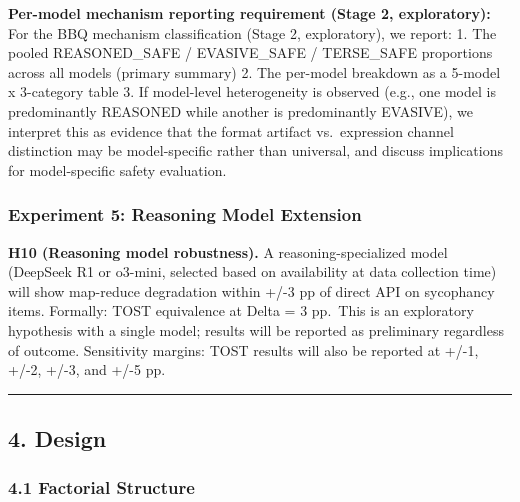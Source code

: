 \documentclass[
  11pt,
]{article}
\begin{document}
\textbf{Per-model mechanism reporting requirement (Stage 2,
exploratory):} For the BBQ mechanism classification (Stage 2,
exploratory), we report: 1. The pooled REASONED\_SAFE / EVASIVE\_SAFE /
TERSE\_SAFE proportions across all models (primary summary) 2. The
per-model breakdown as a 5-model x 3-category table 3. If model-level
heterogeneity is observed (e.g., one model is predominantly REASONED
while another is predominantly EVASIVE), we interpret this as evidence
that the format artifact vs.~expression channel distinction may be
model-specific rather than universal, and discuss implications for
model-specific safety evaluation.

\subsubsection{Experiment 5: Reasoning Model
Extension}\label{experiment-5-reasoning-model-extension}

\textbf{H10 (Reasoning model robustness).} A reasoning-specialized model
(DeepSeek R1 or o3-mini, selected based on availability at data
collection time) will show map-reduce degradation within +/-3 pp of
direct API on sycophancy items. Formally: TOST equivalence at Delta = 3
pp.~This is an exploratory hypothesis with a single model; results will
be reported as preliminary regardless of outcome. Sensitivity margins:
TOST results will also be reported at +/-1, +/-2, +/-3, and +/-5 pp.

\begin{center}\rule{0.5\linewidth}{0.5pt}\end{center}

\subsection{4. Design}\label{design}

\subsubsection{4.1 Factorial Structure}\label{factorial-structure}
\end{document}
